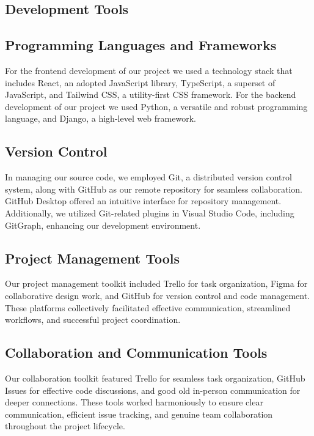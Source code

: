 \documentclass[12pt,a4paper]{article}
\begin{document}
\begin{spacing}{1.5}
    \section{Development Tools}

    \subsection{Programming Languages and Frameworks}
    For the frontend development of our project we used a technology stack that
    includes React, an adopted JavaScript library, TypeScript, a superset of
    JavaScript, and Tailwind CSS, a utility-first CSS framework. For the backend
    development of our project we used Python, a versatile and robust programming
    language, and Django, a high-level web framework.
    \subsection{Version Control}
    In managing our source code, we employed Git, a distributed version control
    system, along with GitHub as our remote repository for seamless collaboration.
    GitHub Desktop offered an intuitive interface for repository management.
    Additionally, we utilized Git-related plugins in Visual Studio Code, including
    GitGraph, enhancing our development environment.

    \subsection{Project Management Tools}
    Our project management toolkit included Trello for task organization, Figma for
    collaborative design work, and GitHub for version control and code management.
    These platforms collectively facilitated effective communication, streamlined
    workflows, and successful project coordination.

    \subsection{Collaboration and Communication Tools}
    Our collaboration toolkit featured Trello for seamless task organization,
    GitHub Issues for effective code discussions, and good old in-person
    communication for deeper connections. These tools worked harmoniously to ensure
    clear communication, efficient issue tracking, and genuine team collaboration
    throughout the project lifecycle.


\end{spacing}
\end{document}
